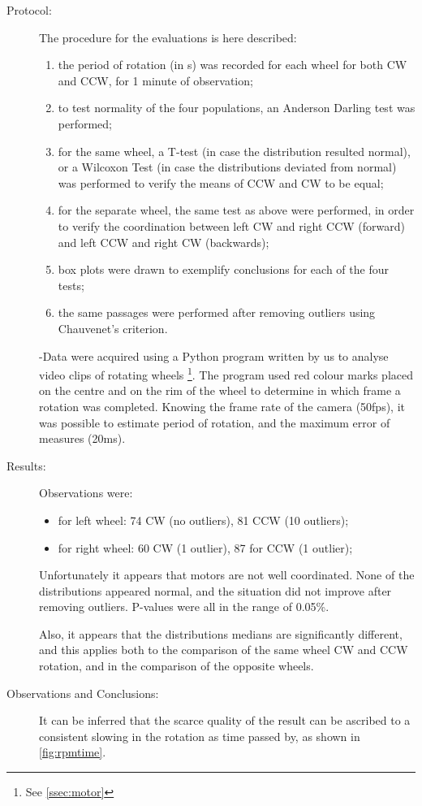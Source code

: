 \documentclass[a4paper,twoside]{book}
\begin{document}
\begin{description}
\item[Protocol:]
  The procedure for the evaluations is here described:
  \begin{enumerate}
    \item the period of rotation (in s) was recorded for each wheel for both CW and CCW, for 1 minute of observation;
    \item to test normality of the four populations, an Anderson Darling test was performed;
    \item for the same wheel, a T-test (in case the distribution resulted normal), or a Wilcoxon Test (in case the distributions deviated from normal) was performed to verify the means of CCW and CW to be equal;
    \item for the separate wheel, the same test as above were performed, in order to verify the coordination between left CW and right CCW (forward) and left CCW and right CW (backwards);
    \item box plots were drawn to exemplify conclusions for each of the four tests;
    \item the same passages were performed after removing outliers using Chauvenet's criterion.
  \end{enumerate}
  -Data were acquired using a Python program written by us to analyse video clips of rotating wheels%
  \footnote{See \autoref{ssec:motor}}.
  The program used red colour marks placed on the centre and on the rim of the wheel to determine in which frame a rotation was completed. Knowing the frame rate of the camera (50fps), it was possible to estimate period of rotation, and the maximum error of measures (20ms).

\item[Results:]
  Observations were:
  \begin{itemize}
    \item for left wheel: 74 CW (no outliers), 81 CCW (10 outliers);
    \item for right wheel: 60 CW (1 outlier), 87 for CCW (1 outlier);
  \end{itemize}
  Unfortunately it appears that motors are not well coordinated. None of the distributions appeared normal, and the situation did not improve after removing outliers. P-values were all in the range of 0.05\%.

  Also, it appears that the distributions medians are significantly different, and this applies both to the comparison of the same wheel CW and CCW rotation, and in the comparison of the opposite wheels.

\item[Observations and Conclusions:]
  It can be inferred that the scarce quality of the result can be ascribed to a consistent slowing in the rotation as time passed by, as shown in
\autoref{fig:rpmtime}.
\end{description}
\afterlist*
\end{document}
